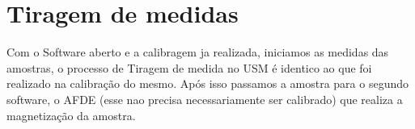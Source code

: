 \documentclass{paper}[geophysics]
\begin{document}
\section{Tiragem de medidas}
Com o Software aberto e a calibragem ja realizada, iniciamos as medidas das amostras, o processo de Tiragem de medida no USM é identico ao que foi realizado na calibração do mesmo. Após isso passamos a amostra para o segundo software, o AFDE (esse nao precisa necessariamente ser calibrado) que realiza a magnetização da amostra.
\end{document}
